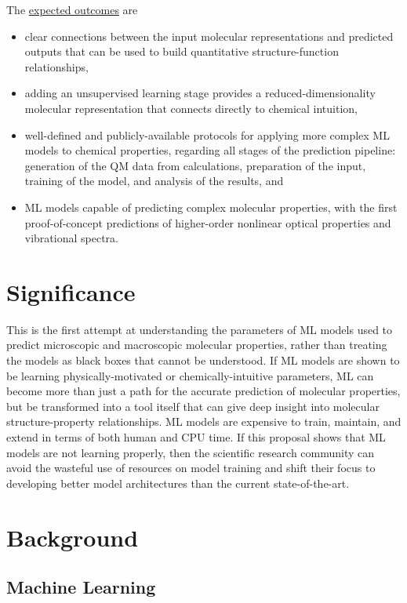 \documentclass[12pt]{article}
\begin{document}
The \uline{expected outcomes} are

\begin{itemize}
\item clear connections between the input molecular representations and predicted outputs that can be used to build quantitative structure-function relationships,
\item adding an unsupervised learning stage provides a reduced-dimensionality molecular representation that connects directly to chemical intuition,
\item well-defined and publicly-available protocols for applying more complex ML models to chemical properties, regarding all stages of the prediction pipeline: generation of the QM data from calculations, preparation of the input, training of the model, and analysis of the results, and
\item ML models capable of predicting complex molecular properties, with the first proof-of-concept predictions of higher-order nonlinear optical properties and vibrational spectra.
\end{itemize}

\section{Significance}
\label{sec:org1b32718}

This is the first attempt at understanding the parameters of ML models used to predict microscopic and macroscopic molecular properties, rather than treating the models as black boxes that cannot be understood. If ML models are shown to be learning physically-motivated or chemically-intuitive parameters, ML can become more than just a path for the accurate prediction of molecular properties, but be transformed into a tool itself that can give deep insight into molecular structure-property relationships. ML models are expensive to train, maintain, and extend in terms of both human and CPU time\cite{43146}. If this proposal shows that ML models are not learning properly, then the scientific research community can avoid the wasteful use of resources on model training and shift their focus to developing better model architectures than the current state-of-the-art.

\section{Background}
\label{sec:orgc744e5d}

\subsection{Machine Learning}
\label{sec:orgaafc35a}
\end{document}
